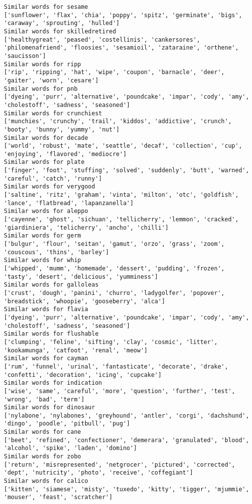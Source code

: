\documentclass[11pt]{article}
\begin{document}
\begin{Verbatim}[commandchars=\\\{\}]
Similar words for sesame
['sunflower', 'flax', 'chia', 'poppy', 'spitz', 'germinate', 'bigs', 'caraway', 'sprouting', 'hulled']
Similar words for skilledretired
['healthygreat', 'peased', 'costellinis', 'cankersores', 'philomenafriend', 'floosies', 'sesamioil', 'zataraine', 'orthene', 'saucisson']
Similar words for ripp
['rip', 'ripping', 'hat', 'wipe', 'coupon', 'barnacle', 'deer', 'gaiter', 'worn', 'cesare']
Similar words for pnb
['dyeing', 'purr', 'alternative', 'poundcake', 'impar', 'cody', 'amy', 'cholestoff', 'sadness', 'seasoned']
Similar words for crunchiest
['munchies', 'crunchy', 'trail', 'kiddos', 'addictive', 'crunch', 'booty', 'bunny', 'yummy', 'nut']
Similar words for decade
['world', 'robust', 'mate', 'seattle', 'decaf', 'collection', 'cup', 'enjoying', 'flavored', 'mediocre']
Similar words for plate
['finger', 'foot', 'stuffing', 'solved', 'suddenly', 'butt', 'warned', 'careful', 'catch', 'runny']
Similar words for verygood
['saltine', 'ritz', 'graham', 'vinta', 'milton', 'otc', 'goldfish', 'lance', 'flatbread', 'lapanzanella']
Similar words for aleppo
['cayenne', 'ghost', 'sichuan', 'tellicherry', 'lemmon', 'cracked', 'giardiniera', 'telicherry', 'ancho', 'chilli']
Similar words for germ
['bulgur', 'flour', 'seitan', 'gamut', 'orzo', 'grass', 'zoom', 'couscous', 'thins', 'barley']
Similar words for whip
['whipped', 'mumm', 'homemade', 'dessert', 'pudding', 'frozen', 'tasty', 'desert', 'delicious', 'yumminess']
Similar words for galloleas
['crust', 'dough', 'panini', 'churro', 'ladygolfer', 'popover', 'breadstick', 'whoopie', 'gooseberry', 'alca']
Similar words for flavia
['dyeing', 'purr', 'alternative', 'poundcake', 'impar', 'cody', 'amy', 'cholestoff', 'sadness', 'seasoned']
Similar words for flushable
['clumping', 'feline', 'sifting', 'clay', 'cosmic', 'litter', 'kookamunga', 'catfoot', 'renal', 'meow']
Similar words for cayman
['rum', 'funnel', 'urinal', 'fantasticate', 'decorate', 'drake', 'confetti', 'decoration', 'icing', 'cupcake']
Similar words for indication
['wise', 'same', 'careful', 'more', 'question', 'further', 'test', 'wrong', 'bad', 'term']
Similar words for dinosaur
['nylabone', 'nylabones', 'greyhound', 'antler', 'corgi', 'dachshund', 'dingo', 'poodle', 'pitbull', 'pug']
Similar words for cane
['beet', 'refined', 'confectioner', 'demerara', 'granulated', 'blood', 'alcohol', 'spike', 'laden', 'domino']
Similar words for zobo
['return', 'misrepresented', 'netgrocer', 'pictured', 'corrected', 'dept', 'nutricity', 'photo', 'receive', 'coffegiant']
Similar words for calico
['kitten', 'siamese', 'misty', 'tuxedo', 'kitty', 'tigger', 'mjummie', 'mouser', 'feast', 'scratcher']

\end{Verbatim}
\end{document}
